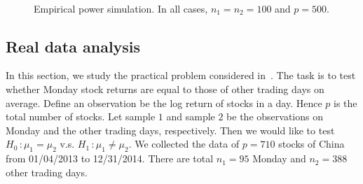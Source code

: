 \documentclass[review]{elsarticle}
\theoremstyle{plain}
\theoremstyle{definition}
\theoremstyle{remark}
\begin{document}
\begin{figure}
{    }
    \\
    \caption{Empirical power simulation. In all cases, $n_1=n_2=100$ and $p=500$.}\label{fig:Power2}
\end{figure}




\subsection{Real data analysis}
In this section, we study the practical problem considered in~\cite{Ma2015A}.
The task is to test whether Monday stock returns are equal to those of other trading days on average.
Define an observation be the log return of stocks in a day.
Hence $p$ is the total number of stocks.
Let sample $1$ and sample $2$ be the observations on Monday and the other trading days, respectively.
Then we would like to test $H_0\, :\mu_1=\mu_2$ v.s. $H_1\,:\mu_1\neq \mu_2$.
We collected the data of $p=710$
 stocks of China
from 01/04/2013 to 12/31/2014. There are total $n_1=95$ Monday and $n_2=388$ other trading days. 
\end{document}
